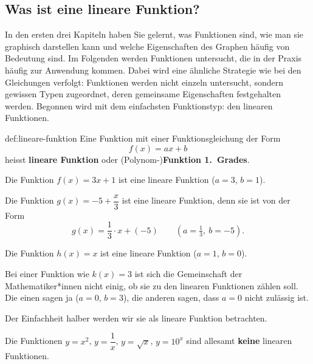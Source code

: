 \subsection{Was ist eine lineare Funktion?}
In den ersten drei Kapiteln haben Sie gelernt, was Funktionen sind, wie man sie graphisch darstellen kann und welche Eigenschaften des Graphen häufig von Bedeutung sind. Im Folgenden werden Funktionen untersucht, die in der Praxis häufig zur Anwendung kommen. Dabei wird eine ähnliche Strategie wie bei den Gleichungen verfolgt: Funktionen werden nicht einzeln untersucht, sondern gewissen Typen zugeordnet, deren gemeinsame Eigenschaften festgehalten werden. Begonnen wird mit dem einfachsten Funktionstyp: den linearen Funktionen.
\begin{deff}{def:lineare-funktion}
    Eine Funktion mit einer Funktionsgleichung der Form
    \[f(x) = ax + b\]
    heisst \textbf{lineare Funktion} oder (Polynom-)\textbf{Funktion 1.~Grades}.
\end{deff}

\begin{example}
    Die Funktion $f(x) = 3x + 1$ ist eine lineare Funktion ($a = 3$, $b = 1$).
\end{example}

\begin{example}
    Die Funktion $g(x) = -5 + \dfrac{x}{3}$ ist eine lineare Funktion, denn sie ist von der Form
    \[g(x) = \frac{1}{3} \cdot x + (-5) \qquad \left(a = \tfrac{1}{3},\ b = -5\right).\]
\end{example}

\begin{example}
    Die Funktion $h(x) = x$ ist eine lineare Funktion ($a = 1$, $b = 0$).
\end{example}

\begin{example}
    Bei einer Funktion wie $k(x) = 3$ ist sich die Gemeinschaft der Mathematiker*innen nicht einig, ob sie zu den linearen Funktionen zählen soll. Die einen sagen ja ($a = 0$, $b = 3$), die anderen sagen, dass $a = 0$ nicht zulässig ist.

    Der Einfachheit halber werden wir sie als lineare Funktion betrachten.
\end{example}

\begin{example}
    Die Funktionen $y = x^{2}$, $y = \dfrac{1}{x}$, $y = \sqrt{x}$, $y = 10^{x}$ sind allesamt \textbf{keine} linearen Funktionen.
\end{example}

